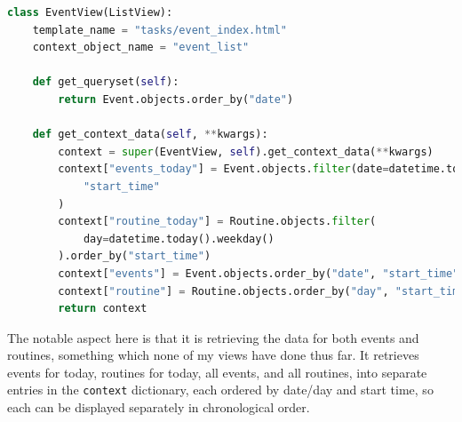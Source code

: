 \documentclass{article}
\begin{document}
\begin{lstlisting}[language=Python, breaklines]
class EventView(ListView):
    template_name = "tasks/event_index.html"
    context_object_name = "event_list"

    def get_queryset(self):
        return Event.objects.order_by("date")

    def get_context_data(self, **kwargs):
        context = super(EventView, self).get_context_data(**kwargs)
        context["events_today"] = Event.objects.filter(date=datetime.today()).order_by(
            "start_time"
        )
        context["routine_today"] = Routine.objects.filter(
            day=datetime.today().weekday()
        ).order_by("start_time")
        context["events"] = Event.objects.order_by("date", "start_time")
        context["routine"] = Routine.objects.order_by("day", "start_time")
        return context
\end{lstlisting}

The notable aspect here is that it is retrieving the data for both events and routines,
something which none of my views have done thus far.
It retrieves events for today,
routines for today,
all events,
and all routines,
into separate entries in the \texttt{context} dictionary,
each ordered by date/day and start time,
so each can be displayed separately in chronological order.
\end{document}
